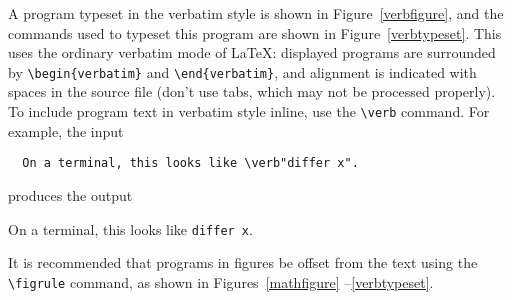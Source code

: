 \documentclass{jfp}
\begin{document}
A program typeset in the verbatim style is shown in
Figure~\ref{verbfigure}, and the commands used to typeset this program
are shown in Figure~\ref{verbtypeset}.  This uses the ordinary
verbatim mode of \LaTeX: displayed programs are surrounded by
\verb|\begin{verbatim}| and \verb|\end{verbatim}|, and alignment is
indicated with spaces in the source file (don't use tabs, which may
not be processed properly).  To include program
text in verbatim style inline, use the \verb|\verb| command.
For example, the input
\begin{center}
\begin{verbatim}
  On a terminal, this looks like \verb"differ x".
\end{verbatim}
\end{center}
produces the output
\begin{center}
  On a terminal, this looks like \verb"differ x".
\end{center}

It is recommended that programs in figures be offset from the text
using the \verb|\figrule| command, as shown in Figures~\ref{mathfigure}%
--\ref{verbtypeset}.
\end{document}
